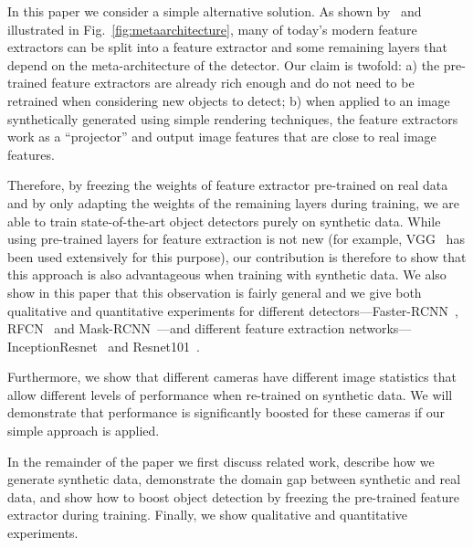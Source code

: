 \documentclass[10pt,twocolumn,letterpaper]{article}
\begin{document}
 


In  this   paper  we   consider  a  simple   alternative  solution.    As  shown
by~\cite{Huang17}  and illustrated  in Fig.~\ref{fig:metaarchitecture},  many of
today's modern feature extractors can be split into a feature extractor and some
remaining  layers that  depend on  the meta-architecture  of the  detector.  Our
claim is twofold: a) the pre-trained  feature extractors are already rich enough
and do not need to be retrained  when considering new objects to detect; b) when
applied to an  image synthetically generated using  simple rendering techniques,
the feature  extractors work as a  ``projector'' and output image  features that
are close to real image features.


Therefore, by freezing the weights of feature extractor pre-trained on real data
and by only adapting the weights of the remaining layers during training, we are
able to train state-of-the-art object detectors purely on synthetic data.  While
using  pre-trained  layers for  feature  extraction  is  not new  (for  example,
VGG~\cite{vgg}   has  been   used  extensively   for  this   purpose),  our
contribution is therefore  to show that this approach is  also advantageous when
training with synthetic data.  We also  show in this paper that this observation
is fairly general and we give  both qualitative and quantitative experiments for
different   detectors---Faster-RCNN~\cite{faster_rcnn},   RFCN~\cite{rfcn}   and
Mask-RCNN~\cite{mask_rcnn}---and       different        feature       extraction
networks---InceptionResnet~\cite{inception_resnet}                           and
Resnet101~\cite{resnet101}.


Furthermore, we show that different cameras have different image statistics that
allow different  levels of performance  when re-trained on  synthetic data.
We will demonstrate that performance  is significantly boosted for these cameras
if our simple approach is applied.


In the  remainder of the  paper we  first discuss  related work, describe  how we
generate synthetic data,  demonstrate the domain gap between  synthetic and real
data, and show how to boost  object detection by freezing the pre-trained feature
extractor  during  training.  Finally,  we  show  qualitative  and  quantitative
experiments.
\end{document}
